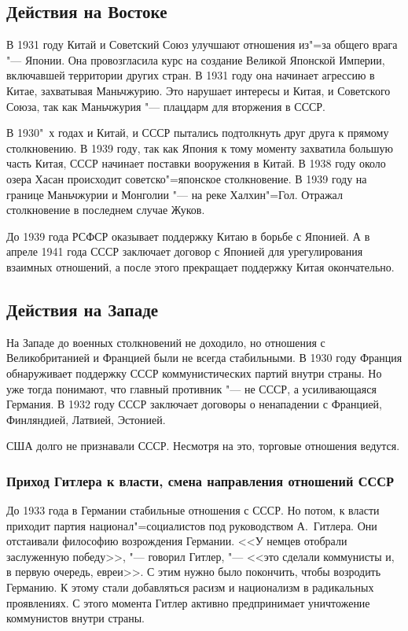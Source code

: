 \subsection{Действия на Востоке}

В 1931 году Китай и Советский Союз улучшают отношения из"=за общего врага "--- Японии. Она провозгласила курс на создание Великой Японской Империи, включавшей территории других стран. В 1931 году она начинает агрессию в Китае, захватывая Маньчжурию. Это нарушает интересы и Китая, и Советского Союза, так как Маньчжурия "--- плацдарм для вторжения в СССР. 

В 1930"~х годах и Китай, и СССР пытались подтолкнуть друг друга к прямому столкновению. В 1939 году, так как Япония к тому моменту захватила большую часть Китая, СССР начинает поставки вооружения в Китай. В 1938 году около озера Хасан происходит советско"=японское столкновение. В 1939 году на границе Маньчжурии и Монголии "--- на реке Халхин"=Гол. Отражал столкновение в последнем случае Жуков.

До 1939 года РСФСР оказывает поддержку Китаю в борьбе с Японией. А в апреле 1941 года СССР заключает договор с Японией для урегулирования взаимных отношений, а после этого прекращает поддержку Китая окончательно.

\subsection{Действия на Западе}

На Западе до военных столкновений не доходило, но отношения с Великобританией и Францией были не всегда стабильными. В 1930 году Франция обнаруживает поддержку СССР коммунистических партий внутри страны. Но уже тогда понимают, что главный противник "--- не СССР, а усиливающаяся Германия. В 1932 году СССР заключает договоры о ненападении с Францией, Финляндией, Латвией, Эстонией.

США долго не признавали СССР. Несмотря на это, торговые отношения ведутся.

\subsubsection{\textbf{Приход Гитлера к власти, смена направления отношений СССР}}

До 1933 года в Германии стабильные отношения с СССР. Но потом, к власти приходит партия национал"=социалистов под руководством А.~Гитлера. Они отстаивали философию возрождения Германии. <<У немцев отобрали заслуженную победу>>, "--- говорил Гитлер, "--- <<это сделали коммунисты и, в первую очередь, евреи>>. С этим нужно было покончить, чтобы возродить Германию. К этому стали добавляться расизм и национализм в радикальных проявлениях. С этого момента Гитлер активно предпринимает уничтожение коммунистов внутри страны. 

